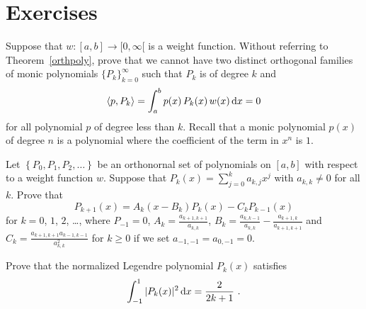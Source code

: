 \section{Exercises}

\begin{question}
Suppose that $w:[a,b] \rightarrow [0,\infty[$ is a weight function.
Without referring to Theorem~\ref{orthpoly}, prove that we cannot have
two distinct orthogonal families of monic polynomials
$\{ P_k \}_{k=0}^\infty$ such that $P_k$ is of degree $k$ and
\[
  \left\langle{p} , {P_k}\right\rangle = \int_a^b p(x)\,P_k(x) \,w(x)\,\mathrm{d}x = 0
\]
for all polynomial $p$ of degree less than $k$.  Recall that a monic
polynomial $p(x)$ of degree $n$ is a polynomial where the coefficient
of the term in $x^n$ is $1$.
\label{apprAQ1}
\end{question}

\begin{question}
Let $\left\{ P_0,P_1,P_2,\ldots \right\}$ be an orthonornal set of
polynomials on $[a,b]$ with respect to a weight function $w$.
Suppose that $\displaystyle P_k(x) = \sum_{j=0}^k a_{k,j}x^j$ with
$a_{k,k} \neq 0$ for all $k$.
Prove that
\begin{equation} \label{apprAQ2equ1}
P_{k+1}(x) = A_k(x-B_k)P_k(x) - C_k P_{k-1}(x)
\end{equation}
for $k=0$, $1$, $2$, \ldots, where $P_{-1} = 0$,
$\displaystyle A_k = \frac{a_{k+1,k+1}}{a_{k,k}}$,
$\displaystyle B_k = \frac{a_{k,k-1}}{a_{k,k}}- \frac{a_{k+1,k}}{a_{k+1,k+1}} $
and
$\displaystyle C_k = \frac{a_{k+1,k+1}a_{k-1,k-1}}{a_{k,k}^2}$
for $k\geq 0$ if we set $a_{-1,-1} = a_{0,-1} = 0$.
\label{apprAQ2}
\end{question}

\begin{question}
Prove that the normalized Legendre polynomial $P_k(x)$ satisfies
\[
\int_{-1}^1 |P_k(x)|^2 \,\mathrm{d}x = \frac{2}{2k+1} \ .
\]
\label{apprAQ3}
\end{question}

